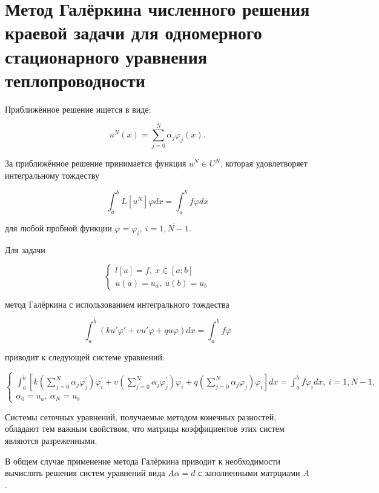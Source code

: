 \documentclass[__main__.tex]{subfiles}
\begin{document}
\section{Метод Галёркина численного решения краевой задачи для одномерного стационарного уравнения теплопроводности}

Приближённое решение ищется в виде:

$$
u^N \left(x\right) = \sum_{j = 0}^{N} \alpha_j \varphi_j \left(x\right).
$$

За приближённое решение принимается функция $u^N \in U^N$, которая удовлетворяет интегральному тождеству

$$
\int_{a}^{b} L \left[u^N\right] \varphi dx = \int_{a}^{b} f \varphi dx
$$

для любой пробной функции $\varphi = \varphi_i, \ i = \overline{1,N-1}$.

Для задачи 

\begin{equation}
\begin{cases}
l \left[u\right] = f, \ x \in [a;b] \\
u\left( a \right)=u_a, \ u \left(b\right) = u_b
\end{cases}
\end{equation}

метод Галёркина с использованием интегрального тождества

$$
\int_{a}^{b} \left(ku'\varphi'+\upsilon u' \varphi + q u \varphi\right) dx = \int_{a}^{b} f\varphi
$$

приводит к следующей системе уравнений:

\begin{equation}
\begin{cases}
\int_{a}^{b} \left[k\left(\sum_{j=0}^{N}\alpha_j \varphi_j^{'}\right)\varphi_i^{'} + \upsilon \left(\sum_{j = 0}^N \alpha_j \varphi_j^{'}\right)\varphi_i + q \left(\sum_{j = 0}^N \alpha_j \varphi_j\right)\varphi_i\right]dx = \int_{a}^b f\varphi_i dx, \ i = \overline{1,N-1},\\ \alpha_0 = u_a, \ \alpha_N = u_b
\end{cases}
\end{equation}

Системы сеточных уравнений, получаемые методом конечных разностей, обладают тем важным свойством, что матрицы коэффициентов этих систем являются разреженными.

В общем случае применение метода Галёркина приводит к необходимости вычислять решения систем уравнений вида $A \alpha = d$ с заполненными матрциами $A$.
\end{document}
